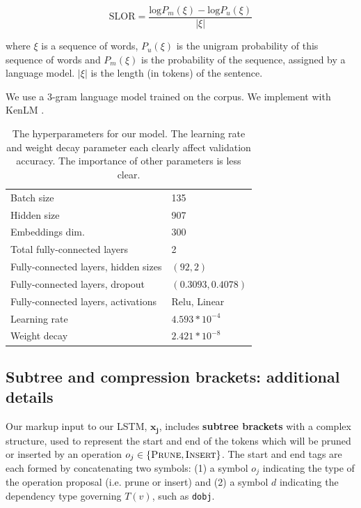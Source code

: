 \begin{equation}
\text{SLOR}=\frac{\text{log}P_m(\xi) - \text{log}P_u(\xi)}{|\xi|}
\end{equation}

where $\xi$ is a sequence of words, $P_u(\xi)$ is the unigram probability of this sequence of words and $P_m(\xi)$ is the probability of the sequence, assigned by a language model.  $|\xi|$ is the length (in tokens) of the sentence.

We use a 3-gram language model trained on the \citet{filippova2013overcoming} corpus. We implement with KenLM \cite{Heafield-kenlm}.


\begin{table}[htb!]
\begin{tabular}{@{}ll@{}}
\toprule
Batch size         & 135                      \\ 
Hidden size        & 907                        \\
Embeddings dim.    & 300                      \\
Total fully-connected layers & 2                        \\
Fully-connected layers, hidden sizes & $(92, 2)$ \\
Fully-connected layers, dropout & $(0.3093, 0.4078)$ \\
Fully-connected layers, activations        & Relu, Linear             \\
Learning rate      & $4.593 * 10^{-4}$   \\
Weight decay       & $2.421 * 10^{-8}$   \\ \bottomrule
\end{tabular}
\caption{The hyperparameters for our model. The learning rate and weight decay parameter each clearly affect validation accuracy. The importance of other parameters is less clear. } 
\end{table}

\subsection{Subtree and compression brackets: additional details}\label{s:subtree}

Our markup input to our LSTM, $\bm{x_j}$, includes \textbf{subtree brackets} with a complex structure, used to represent the start and end of the tokens which will be pruned or inserted by an operation $o_j \in \{ \textsc{Prune},\textsc{Insert}\}$. The start and end tags are each formed by concatenating two symbols: (1) a symbol $o_j$ indicating the type of the operation proposal (i.e. prune or insert) and (2) a symbol $d$ indicating the dependency type governing $T(v)$, such as \texttt{dobj}. 

